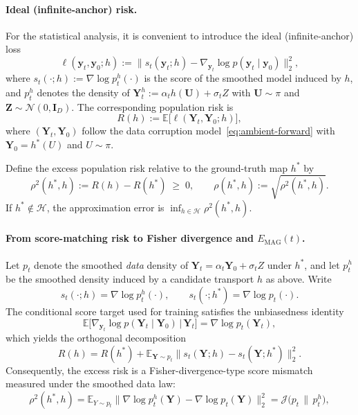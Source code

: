 \documentclass[12pt]{article}
\theoremstyle{definition} %
\newcommand{\U}{\bm U}
\newcommand{\Y}{\bm Y}
\newcommand{\y}{\bm y}
\providecommand{\E}{\mathbb{E}}
\begin{document}
\paragraph{Ideal (infinite-anchor) risk.}
For the statistical analysis, it is convenient to introduce the ideal (infinite-anchor) loss
\begin{equation}
\label{eq:ell-def}
\ell(\y_t,\y_0;h)
:=
\bigl\| s_t(\y_t;h)-\nabla_{\y_t}\log p(\y_t\mid \y_0)\bigr\|_2^2,
\end{equation}
where $s_t(\cdot;h):=\nabla\log p_t^{h}(\cdot)$ is the score of the smoothed model induced by $h$, and
$p_t^{h}$ denotes the density of
\(
\Y_t^{h}:=\alpha_t h(\U)+\sigma_t Z
\)
with $\U\sim\pi$ and $\bm Z\sim\mathcal N(0,\bm{I}_D)$.
The corresponding population risk is
\[
R(h):=\E\big[\ell(\Y_t,\Y_0;h)\big],
\]
where $(\Y_t,\Y_0)$ follow the data corruption model~\eqref{eq:ambient-forward} with $\Y_0=h^*(U)$ and $U\sim\pi$.

Define the excess population risk relative to the ground-truth map $h^*$ by
\begin{equation}
\label{eq:excess-risk}
\rho^2(h^*,h)
:=
R(h)-R(h^*)
\;\ge\;0,
\qquad
\rho(h^*,h):=\sqrt{\rho^2(h^*,h)}.
\end{equation}
If $h^*\notin\mathcal H$, the approximation error is $\inf_{h\in\mathcal H}\rho^2(h^*,h)$.

\paragraph{From score-matching risk to Fisher divergence and $E_{\mathrm{MAG}}(t)$.}
Let $p_t$ denote the smoothed \emph{data} density of $\Y_t=\alpha_t\Y_0+\sigma_t Z$ under $h^*$, and let $p_t^{h}$ be the smoothed density induced by a candidate transport $h$ as above.
Write
\[
s_t(\cdot;h)=\nabla\log p_t^{h}(\cdot),
\qquad
s_t(\cdot;h^*)=\nabla\log p_t(\cdot).
\]
The conditional score target used for training satisfies the unbiasedness identity
\[
\E\!\big[\nabla_{\y_t}\log p(\Y_t\mid \Y_0)\,\big|\,\Y_t\big]
=
\nabla \log p_t(\Y_t),
\]
which yields the orthogonal decomposition
\[
R(h)
=
R(h^*)
+
\E_{\Y\sim p_t}\bigl\| s_t(\Y;h)-s_t(\Y;h^*)\bigr\|_2^2.
\]
Consequently, the excess risk is a Fisher-divergence-type score mismatch measured under the smoothed data law:
\begin{equation}
\label{eq:excess-risk-fisher}
\rho^2(h^*,h)
=
\E_{Y\sim p_t}\bigl\|\nabla\log p_t^{h}(\Y)-\nabla\log p_t(\Y)\bigr\|_2^2
=
\mathcal J\!\bigl(p_t\,\|\,p_t^{h}\bigr),
\end{equation}
\end{document}
